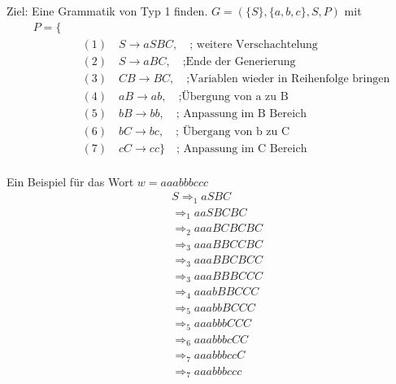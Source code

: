 \documentclass{article}
\begin{document}
Ziel: Eine Grammatik von Typ 1 finden.
$G = (\{S\}, \{a, b, c\}, S, P)$ mit
\begin{equation}
\begin{split}
P = \{ \\\
&\quad (1) \quad S \rightarrow aSBC, \quad \text{; weitere Verschachtelung} \\\ 
&\quad (2) \quad S \rightarrow aBC, \quad \text{;Ende der Generierung} \\\
&\quad (3) \quad CB \rightarrow BC, \quad \text{;Variablen wieder in Reihenfolge bringen} \\\
&\quad (4) \quad aB \rightarrow ab, \quad \text{;Übergung von a zu B} \\\
&\quad (5) \quad bB \rightarrow bb, \quad \text{; Anpassung im B Bereich} \\\
&\quad (6) \quad bC \rightarrow bc, \quad \text{; Übergang von b zu C} \\\
&\quad (7) \quad cC \rightarrow cc \} \quad \text{; Anpassung im C Bereich} \\\
\end{split}
\end{equation}

Ein Beispiel für das Wort $w=aaabbbccc$
\begin{equation}
\begin{split}
&S \Rightarrow_1 aSBC \\\ 
&\Rightarrow_1 aaSBCBC \\\ 
&\Rightarrow_2 aaaBCBCBC \\\ 
&\Rightarrow_3 aaaBBCCBC \\\ 
&\Rightarrow_3 aaaBBCBCC \\\ 
&\Rightarrow_3 aaaBBBCCC \\\ 
&\Rightarrow_4 aaabBBCCC \\\ 
&\Rightarrow_5 aaabbBCCC \\\
&\Rightarrow_5 aaabbbCCC \\\ 
&\Rightarrow_6 aaabbbcCC \\\ 
&\Rightarrow_7 aaabbbccC \\\ 
&\Rightarrow_7 aaabbbccc \\\ 
\end{split}
\end{equation}
\end{document}
